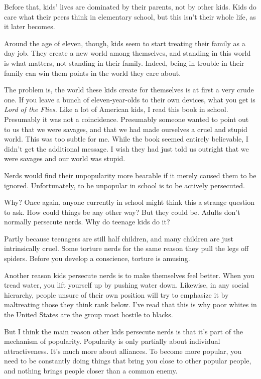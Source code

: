 Before that, kids' lives are dominated by their parents, not by other
kids. Kids do care what their peers think in elementary school, but this
isn't their whole life, as it later becomes.

Around the age of eleven, though, kids seem to start treating their
family as a day job. They create a new world among themselves, and
standing in this world is what matters, not standing in their family.
Indeed, being in trouble in their family can win them points in the
world they care about.

The problem is, the world these kids create for themselves is at first a
very crude one. If you leave a bunch of eleven-year-olds to their own
devices, what you get is \emph{Lord of the Flies.} Like a lot of
American kids, I read this book in school. Presumably it was not a
coincidence. Presumably someone wanted to point out to us that we were
savages, and that we had made ourselves a cruel and stupid world. This
was too subtle for me. While the book seemed entirely believable, I
didn't get the additional message. I wish they had just told us outright
that we were savages and our world was stupid.

Nerds would find their unpopularity more bearable if it merely caused
them to be ignored. Unfortunately, to be unpopular in school is to be
actively persecuted.

Why? Once again, anyone currently in school might think this a strange
question to ask. How could things be any other way? But they could be.
Adults don't normally persecute nerds. Why do teenage kids do it?

Partly because teenagers are still half children, and many children are
just intrinsically cruel. Some torture nerds for the same reason they
pull the legs off spiders. Before you develop a conscience, torture is
amusing.

Another reason kids persecute nerds is to make themselves feel better.
When you tread water, you lift yourself up by pushing water down.
Likewise, in any social hierarchy, people unsure of their own position
will try to emphasize it by maltreating those they think rank below.
I've read that this is why poor whites in the United States are the
group most hostile to blacks.

But I think the main reason other kids persecute nerds is that it's part
of the mechanism of popularity. Popularity is only partially about
individual attractiveness. It's much more about alliances. To become
more popular, you need to be constantly doing things that bring you
close to other popular people, and nothing brings people closer than a
common enemy.

